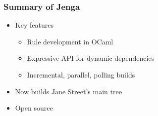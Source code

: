 \documentclass{beamer}
\begin{document}









\begin{frame}[fragile]
\frametitle{Summary of Jenga}
\begin{itemize}
\item Key features
\begin{itemize}
\item Rule development in OCaml
\item Expressive API for dynamic dependencies
\item Incremental, parallel, polling builds
\end{itemize}
\item Now builds Jane Street's main tree
\item Open source
\begin{center}
\end{center}
\vskip12pt
\end{itemize}
\end{frame}
\end{document}
